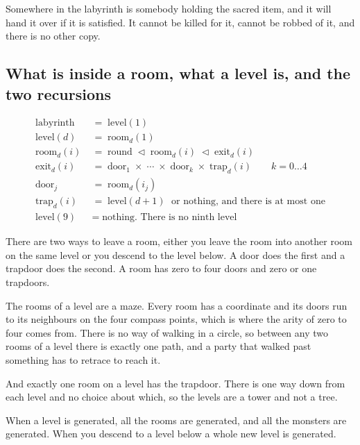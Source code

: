 \documentclass[11pt,a4paper]{article}
\begin{document}
Somewhere in the
labyrinth is somebody holding the sacred item, and it will hand it over if it is satisfied. It cannot
be killed for it, cannot be robbed of it, and there is no other copy.

\subsection{What is inside a room, what a level is, and the two recursions}
\label{sec:defn}

\begin{center}
\begin{tcolorbox}[plainbg, colback=pale, width=0.9\textwidth]
\begin{align*}
\text{labyrinth}   \;&=\; \text{level}(1) \\
\text{level}(d)    \;&=\; \text{room}_d(1) \\
\text{room}_d(i)   \;&=\; \text{round} \;\lhd\; \text{room}_d(i) \;\lhd\; \text{exit}_d(i) \\
\text{exit}_d(i)   \;&=\; \text{door}_1 \;\times\; \cdots \;\times\; \text{door}_k \;\times\; \text{trap}_d(i)
   \qquad k = 0 \ldots 4 \\
\text{door}_j      \;&=\; \text{room}_d(i_j) \\
\text{trap}_d(i)   \;&=\; \text{level}(d{+}1) \;\text{ or nothing, and there is at most one} \\
\text{level}(9)    \;&=\; \text{nothing. There is no ninth level}
\end{align*}
\end{tcolorbox}
\end{center}

There are two ways to leave a room, either you leave the room into another room on the same level
or you descend to the level below. A door does the first and a trapdoor does the second. A room has
zero to four doors and zero or one trapdoors.

The rooms of a level are a maze. Every room has a coordinate and its doors run to its neighbours on
the four compass points, which is where the arity of zero to four comes from. There is no way of
walking in a circle, so between any two rooms of a level there is exactly one path, and a party that
walked past something has to retrace to reach it.

And exactly one room on a level has the trapdoor. There is one way down from each level and no
choice about which, so the levels are a tower and not a tree.

When a level is generated, all the rooms are generated, and all the monsters are generated. When you
descend to a level below a whole new level is generated.
\end{document}
